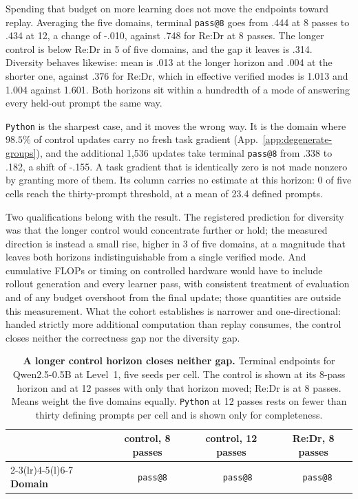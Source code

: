 Spending that budget on more learning does not move the endpoints toward
replay. Averaging the five domains, terminal \texttt{pass@8} goes from
.444 at 8 passes to .434 at 12,
a change of -.010, against .748 for Re:Dr at
8 passes. The longer control is below Re:Dr in
5 of five domains, and the gap it leaves is .314. Diversity
behaves likewise: mean \pmd{} is .013 at the longer horizon and
.004 at the shorter one, against .376 for Re:Dr, which
in effective verified modes is 1.013 and 1.004 against
1.601. Both horizons sit within a hundredth of a mode of answering
every held-out prompt the same way.

\texttt{Python} is the sharpest case, and it moves the wrong way. It is the
domain where $98.5\%$ of control updates carry no fresh task gradient
(App.~\ref{app:degenerate-groups}), and the additional 1,536 updates take
terminal \texttt{pass@8} from .338 to .182, a shift of
-.155. A task gradient that is identically zero is not made
nonzero by granting more of them. Its \pmd{} column carries no estimate at
this horizon: 0 of five cells reach the thirty-prompt
threshold, at a mean of 23.4 defined prompts.

Two qualifications belong with the result. The registered prediction for
diversity was that the longer control would concentrate further or hold; the
measured direction is instead a small rise, higher in 3 of five
domains, at a magnitude that leaves both horizons indistinguishable from a
single verified mode. And cumulative FLOPs or timing on controlled hardware
would have to include rollout generation and every learner pass, with
consistent treatment of evaluation and of any budget overshoot from the final
update; those quantities are outside this measurement. What the cohort
establishes is narrower and one-directional: handed strictly more additional
computation than replay consumes, the control closes neither the correctness
gap nor the diversity gap.

\begin{table}[!htbp]
  \centering
  \caption{\textbf{A longer control horizon closes neither gap.}
  Terminal endpoints for Qwen2.5-0.5B at Level~1, five seeds per cell. The
  control is shown at its 8-pass horizon and at 12
  passes with only that horizon moved; Re:Dr is at 8 passes.
  Means weight the five domains equally. \texttt{Python} \pmd{} at
  12 passes rests on fewer than thirty defining prompts per cell and
  is shown only for completeness.}
  \label{tab:extended-horizon-control}
  \small
  \setlength{\tabcolsep}{5pt}
  \begin{tabular}{@{}l*{6}{r}@{}}
    \toprule
    & \multicolumn{2}{c}{\textbf{control, 8 passes}}
      & \multicolumn{2}{c}{\textbf{control, 12 passes}}
      & \multicolumn{2}{c}{\textbf{Re:Dr, 8 passes}} \\
    \cmidrule(lr){2-3}\cmidrule(lr){4-5}\cmidrule(l){6-7}
    \textbf{Domain} & \texttt{pass@8} & \pmd{} & \texttt{pass@8} & \pmd{}
      & \texttt{pass@8} & \pmd{} \\
    \midrule
    
  \end{tabular}
\end{table}

